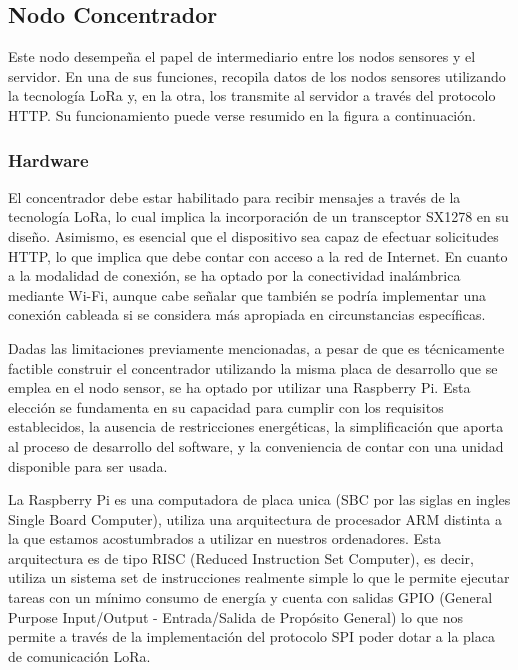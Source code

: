 \clearpage
\subsection{Nodo Concentrador}
Este nodo desempeña el papel de intermediario entre los nodos sensores y el servidor. En una de sus funciones, recopila datos de los nodos sensores utilizando la tecnología LoRa y, en la otra, los transmite al servidor a través del protocolo HTTP. Su funcionamiento puede verse resumido en la figura a continuación.




\subsubsection{Hardware}
El concentrador debe estar habilitado para recibir mensajes a través de la tecnología LoRa, lo cual implica la incorporación de un transceptor SX1278 en su diseño. Asimismo, es esencial que el dispositivo sea capaz de efectuar solicitudes HTTP, lo que implica que debe contar con acceso a la red de Internet. En cuanto a la modalidad de conexión, se ha optado por la conectividad inalámbrica mediante Wi-Fi, aunque cabe señalar que también se podría implementar una conexión cableada si se considera más apropiada en circunstancias específicas.

Dadas las limitaciones previamente mencionadas, a pesar de que es técnicamente factible construir el concentrador utilizando la misma placa de desarrollo que se emplea en el nodo sensor, se ha optado por utilizar una Raspberry Pi. Esta elección se fundamenta en su capacidad para cumplir con los requisitos establecidos, la ausencia de restricciones energéticas, la simplificación que aporta al proceso de desarrollo del software, y la conveniencia de contar con una unidad disponible para ser usada.


La Raspberry Pi es una computadora de placa unica (SBC por las siglas en ingles Single Board Computer), utiliza una arquitectura de procesador ARM distinta a la que estamos acostumbrados a utilizar en nuestros ordenadores. Esta arquitectura es de tipo RISC (Reduced Instruction Set Computer), es decir, utiliza un sistema set de instrucciones realmente simple lo que le permite ejecutar tareas con un mínimo consumo de energía y cuenta con salidas GPIO (General Purpose Input/Output - Entrada/Salida de Propósito General) lo que nos permite a través de la implementación del protocolo SPI poder dotar a la placa de comunicación LoRa.

